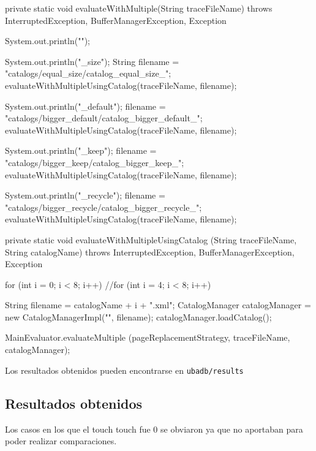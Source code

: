 \newpage
\begin{verbatimtab}[4]
private static void evaluateWithMultiple(String traceFileName) 
	throws InterruptedException, BufferManagerException, Exception
{	
	System.out.println("\nMultipleBufferPool");
		
	System.out.println("\nequal_size\n");
	String filename = "catalogs/equal_size/catalog_equal_size_";
	evaluateWithMultipleUsingCatalog(traceFileName, filename);
		
	System.out.println("\nbigger_default\n");
	filename = "catalogs/bigger_default/catalog_bigger_default_";
	evaluateWithMultipleUsingCatalog(traceFileName, filename);
		
	System.out.println("\nbigger_keep\n");
	filename = "catalogs/bigger_keep/catalog_bigger_keep_";
	evaluateWithMultipleUsingCatalog(traceFileName, filename);
		
	System.out.println("\nbigger_recycle\n");
	filename = "catalogs/bigger_recycle/catalog_bigger_recycle_";
	evaluateWithMultipleUsingCatalog(traceFileName, filename);
}
	
private static void evaluateWithMultipleUsingCatalog
	(String traceFileName, String catalogName) 
	throws InterruptedException, BufferManagerException, Exception
{
	for (int i = 0; i < 8; i++)
	//for (int i = 4; i < 8; i++)
	{
		String filename = catalogName + i + ".xml";
		CatalogManager catalogManager = new CatalogManagerImpl("", filename);
		catalogManager.loadCatalog();

		MainEvaluator.evaluateMultiple
			(pageReplacementStrategy, traceFileName, catalogManager);
		}
	}
\end{verbatimtab}


Los resultados obtenidos pueden encontrarse en \texttt{ubadb/results}


\subsection{Resultados obtenidos}

Los casos en los que el touch touch fue 0 se obviaron ya que no 
aportaban para poder realizar comparaciones.


